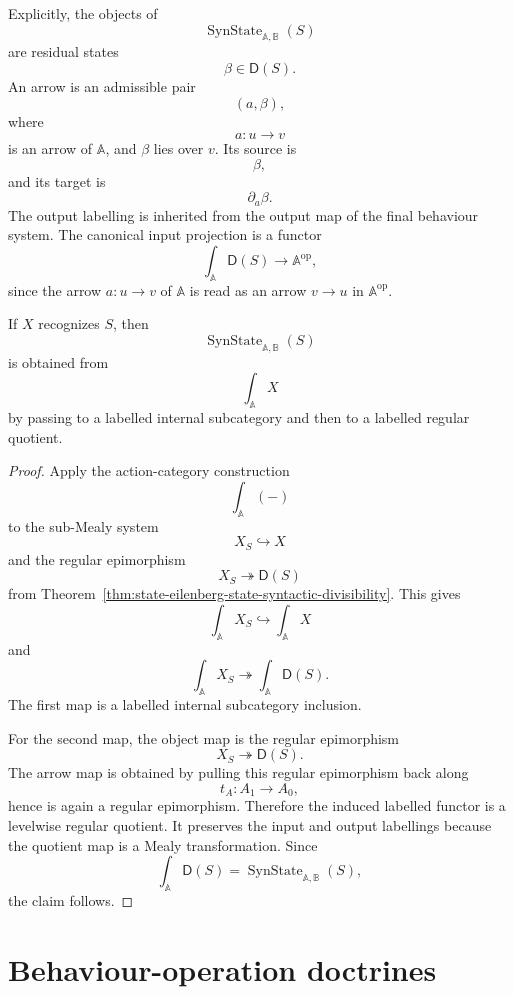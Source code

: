 Explicitly, the objects of
\[
\operatorname{SynState}_{\mathbb A,\mathbb B}(S)
\]
are residual states
\[
\beta\in \mathsf D(S).
\]
An arrow is an admissible pair
\[
(a,\beta),
\]
where
\[
a:u\to v
\]
is an arrow of \(\mathbb A\), and \(\beta\) lies over \(v\). Its source is
\[
\beta,
\]
and its target is
\[
\partial_a\beta.
\]
The output labelling is inherited from the output map of the final behaviour
system. The canonical input projection is a functor
\[
\int_{\mathbb A}\mathsf D(S)\longrightarrow \mathbb A^{\mathrm{op}},
\]
since the arrow \(a:u\to v\) of \(\mathbb A\) is read as an arrow
\(v\to u\) in \(\mathbb A^{\mathrm{op}}\).

\begin{corollary}
\label{cor:state-eilenberg-labelled-state-divisibility}
If \(X\) recognizes \(S\), then
\[
\operatorname{SynState}_{\mathbb A,\mathbb B}(S)
\]
is obtained from
\[
\int_{\mathbb A}X
\]
by passing to a labelled internal subcategory and then to a labelled regular
quotient.
\end{corollary}

\begin{proof}
Apply the action-category construction
\[
\int_{\mathbb A}(-)
\]
to the sub-Mealy system
\[
X_S\hookrightarrow X
\]
and the regular epimorphism
\[
X_S\twoheadrightarrow\mathsf D(S)
\]
from Theorem~\ref{thm:state-eilenberg-state-syntactic-divisibility}. This
gives
\[
\int_{\mathbb A}X_S
\hookrightarrow
\int_{\mathbb A}X
\]
and
\[
\int_{\mathbb A}X_S
\twoheadrightarrow
\int_{\mathbb A}\mathsf D(S).
\]
The first map is a labelled internal subcategory inclusion.

For the second map, the object map is the regular epimorphism
\[
X_S\twoheadrightarrow\mathsf D(S).
\]
The arrow map is obtained by pulling this regular epimorphism back along
\[
t_A:A_1\to A_0,
\]
hence is again a regular epimorphism. Therefore the induced labelled functor
is a levelwise regular quotient. It preserves the input and output labellings
because the quotient map is a Mealy transformation. Since
\[
\int_{\mathbb A}\mathsf D(S)
=
\operatorname{SynState}_{\mathbb A,\mathbb B}(S),
\]
the claim follows.
\end{proof}

\section{Behaviour-operation doctrines}
\label{sec:state-eilenberg-behaviour-operation-doctrines}

